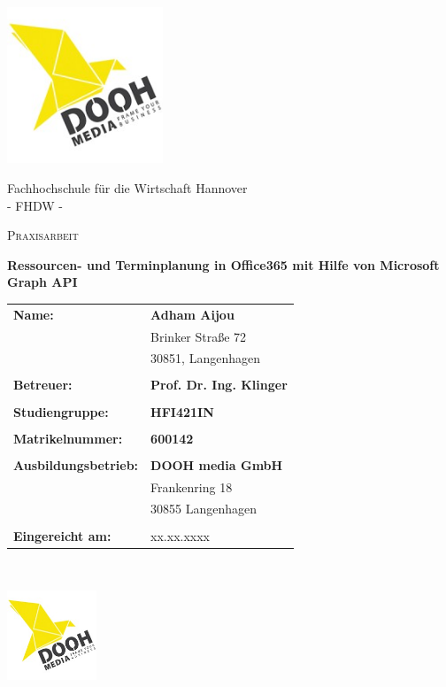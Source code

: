 



\begin{titlepage}
    \centering
    \includegraphics[width=0.35\textwidth]{Bilder/doohMedia}\par\vspace{1cm}
    Fachhochschule für die Wirtschaft Hannover \\
    - FHDW -\\
    {\scshape\Large Praxisarbeit \par}
    \vspace{1cm}
    {\huge\bfseries Ressourcen- und Terminplanung in Office365 mit Hilfe von Microsoft Graph API \par}
    \vspace{1cm}
    \normalsize{
        \begin{tabular}{l l}
            \textbf{Name:} & \textbf{Adham Aijou} \\
            &	Brinker Straße 72 \\
            &	30851, Langenhagen \\
            \\

            \textbf{Betreuer:} & \textbf{Prof. Dr.  Ing. Klinger}\\
            \\
            \textbf{Studiengruppe:} & \textbf{HFI421IN}\\
            \\
            \textbf{Matrikelnummer:}  & \textbf{600142} \\
            \\
            \textbf{Ausbildungsbetrieb:}  & \textbf{DOOH media GmbH}\\
            & Frankenring 18\\
            & 30855 Langenhagen    \\
            \\
            \textbf{Eingereicht am:} & xx.xx.xxxx
        \end{tabular}\\
    }
    \vfill
    \flushright \includegraphics[width=0.2\textwidth]{Bilder/doohMedia}\par\vspace{1cm}

\end{titlepage}

